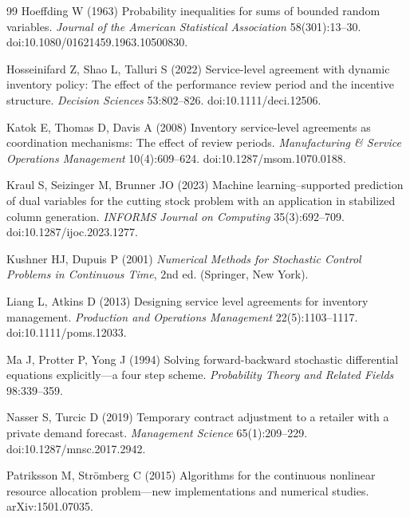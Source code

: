 \documentclass[11pt,letterpaper]{article}
\theoremstyle{definition}
\newcommand{\1}{\mathbf 1}
\begin{document}
\begin{thebibliography}{99}
Hoeffding W (1963) Probability inequalities for sums of bounded random variables. \emph{Journal of the American Statistical Association} 58(301):13--30. doi:10.1080/01621459.1963.10500830.

Hosseinifard Z, Shao L, Talluri S (2022) Service-level agreement with dynamic inventory policy: The effect of the performance review period and the incentive structure. \emph{Decision Sciences} 53:802--826. doi:10.1111/deci.12506.

Katok E, Thomas D, Davis A (2008) Inventory service-level agreements as coordination mechanisms: The effect of review periods. \emph{Manufacturing \& Service Operations Management} 10(4):609--624. doi:10.1287/msom.1070.0188.

Kraul S, Seizinger M, Brunner JO (2023) Machine learning--supported prediction of dual variables for the cutting stock problem with an application in stabilized column generation. \emph{INFORMS Journal on Computing} 35(3):692--709. doi:10.1287/ijoc.2023.1277.

Kushner HJ, Dupuis P (2001) \emph{Numerical Methods for Stochastic Control Problems in Continuous Time}, 2nd ed. (Springer, New York).

Liang L, Atkins D (2013) Designing service level agreements for inventory management. \emph{Production and Operations Management} 22(5):1103--1117. doi:10.1111/poms.12033.

Ma J, Protter P, Yong J (1994) Solving forward-backward stochastic differential equations explicitly---a four step scheme. \emph{Probability Theory and Related Fields} 98:339--359.

Nasser S, Turcic D (2019) Temporary contract adjustment to a retailer with a private demand forecast. \emph{Management Science} 65(1):209--229. doi:10.1287/mnsc.2017.2942.


Patriksson M, Str\"omberg C (2015) Algorithms for the continuous nonlinear resource allocation problem---new implementations and numerical studies. arXiv:1501.07035.


\end{thebibliography}
\end{document}
